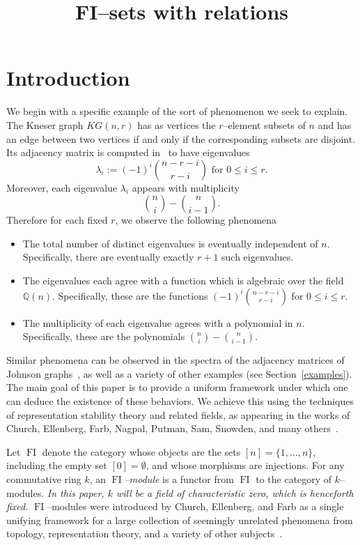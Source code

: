 \documentclass[ALCO,ThmDefs,Unicode,epreuves]{cedram}
\author{\firstname{Eric} \lastname{Ramos}}
\author{\firstname{David} \lastname{Speyer}}
\author{\firstname{Graham} \lastname{White}}
\title{FI--sets with relations}
\DeclareMathOperator{\FI}{FI}
\newcommand{\Q}{\mathbb{Q}}
\begin{document}
\maketitle

\section{Introduction}

We begin with a specific example of the sort of phenomenon we seek to explain. 
The Kneser graph $KG(n,r)$ has as vertices the $r$--element subsets of $n$ and has an edge between two vertices if and only if the corresponding subsets are disjoint.
Its adjacency matrix is computed in~\cite[Section~9.4]{GR} to have eigenvalues
\[
\lambda_i := (-1)^i\binom{n-r-i}{r-i} \mbox{ for } 0 \leq i \leq r.
\]
 Moreover, each eigenvalue $\lambda_i$ appears with multiplicity 
\[
\binom{n}{i} - \binom{n}{i-1}.
\]
Therefore for each fixed $r$, we observe the following phenomena
\begin{itemize}
\item The total number of distinct eigenvalues is eventually independent of $n$. Specifically, there are eventually exactly $r+1$ such eigenvalues.
\item The eigenvalues each agree with a function which is algebraic over the field $\Q(n)$. Specifically, these are the functions $(-1)^i\binom{n-r-i}{r-i}$ for $0 \leq i \leq r$.
\item The multiplicity of each eigenvalue agrees with a polynomial in $n$. Specifically, these are the polynomials $\binom{n}{i} - \binom{n}{i-1}$.
\end{itemize}
Similar phenomena can be observed in the spectra of the adjacency matrices of Johnson graphs~\cite{BCN}, as well as a variety of other examples (see Section~\ref{examples}). The main goal of this paper is to provide a uniform framework under which one can deduce the existence of these behaviors. We achieve this using the techniques of representation stability theory and related fields, as appearing in the works of Church, Ellenberg, Farb, Nagpal, Putman, Sam, Snowden, and many others~\cite{CEF,CEFN,CF,P,SS}.

Let $\FI$ denote the category whose objects are the sets $[n] = \{1,\ldots, n\}$, including the empty set $[0] = \emptyset$, and whose morphisms are injections. For any commutative ring $k$, an \emph{$\FI$--module} is a functor from $\FI$ to the category of $k$--modules. \emph{In this paper, $k$ will be a field of characteristic zero, which is henceforth fixed.} $\FI$--modules were introduced by Church, Ellenberg, and Farb as a single unifying framework for a large collection of seemingly unrelated phenomena from topology, representation theory, and a variety of other subjects~\cite{CEF}.
\end{document}
